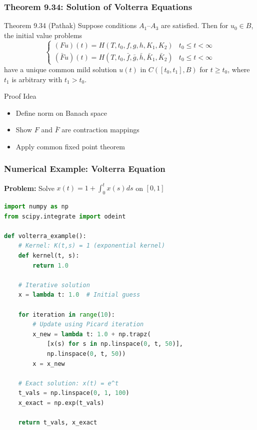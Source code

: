 \documentclass[aspectratio=169,10pt]{beamer}
\begin{document}
\begin{frame}
    \frametitle{Theorem 9.34: Solution of Volterra Equations}

    \begin{block}{Theorem 9.34 (Pathak)}
        Suppose conditions $A_1$--$A_3$ are satisfied. Then for $u_0 \in B$, the initial value problems
        \[
        \begin{cases}
            (Fu)(t) = H(T, t_0, f, g, h, K_1, K_2) & t_0 \leq t < \infty \\
            (\bar{F}u)(t) = H(T, t_0, \bar{f}, \bar{g}, \bar{h}, \bar{K}_1, \bar{K}_2) & t_0 \leq t < \infty
        \end{cases}
        \]
        have a unique common mild solution $u(t)$ in $C([t_0, t_1], B)$ for $t \geq t_0$, where $t_1$ is arbitrary with $t_1 > t_0$.
    \end{block}

    \bigskip

    \begin{alertblock}{Proof Idea}
        \begin{itemize}
            \item Define norm on Banach space
            \item Show $F$ and $\bar{F}$ are contraction mappings
            \item Apply common fixed point theorem
        \end{itemize}
    \end{alertblock}
\end{frame}

\begin{frame}[fragile]
    \frametitle{Numerical Example: Volterra Equation}

    \textbf{Problem:} Solve $x(t) = 1 + \int_0^t x(s)ds$ on $[0, 1]$

    \bigskip

    \begin{lstlisting}[language=Python, caption=Volterra Equation Solver]
import numpy as np
from scipy.integrate import odeint

def volterra_example():
    # Kernel: K(t,s) = 1 (exponential kernel)
    def kernel(t, s):
        return 1.0

    # Iterative solution
    x = lambda t: 1.0  # Initial guess

    for iteration in range(10):
        # Update using Picard iteration
        x_new = lambda t: 1.0 + np.trapz(
            [x(s) for s in np.linspace(0, t, 50)],
            np.linspace(0, t, 50))
        x = x_new

    # Exact solution: x(t) = e^t
    t_vals = np.linspace(0, 1, 100)
    x_exact = np.exp(t_vals)

    return t_vals, x_exact
    \end{lstlisting}
\end{frame}
\end{document}

